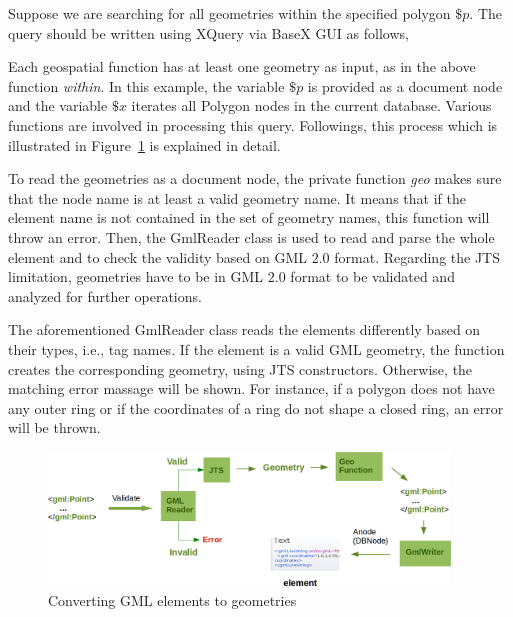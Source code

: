 \documentclass[a4paper,12pt]{article}
\begin{document}
Suppose we are searching for all geometries within the specified polygon $\$p$. The query should be written using XQuery via BaseX GUI as follows,
\vspace{10px}
\vspace{10px}
Each geospatial function has at least one geometry as input, as in the above function \textit{within}. In this example, the variable $\$p$ is provided as a document node and the variable $\$x$ iterates all Polygon nodes in the current database. Various functions are involved in processing this query. Followings, this process which is illustrated in Figure~\ref{figGeoModuleProcess} is explained in detail. 

To read the geometries as a document node, the private function \textit{geo} makes sure that the node name is at least a valid geometry name. It means that if the element name is not contained in the set of geometry names, this function will throw an error. 
Then, the GmlReader class is used to read and parse the whole element and to check the validity based on GML $2.0$ format. Regarding the JTS limitation, geometries have to be in GML $2.0$ format to be validated and analyzed for further operations. 

The aforementioned GmlReader class reads the elements differently based on their types, i.e., tag names. If the element is a valid GML geometry, the function creates the corresponding geometry, using JTS constructors. Otherwise, the matching error massage will be shown. For instance, if a polygon does not have any outer ring or if the coordinates of a ring do not shape a closed ring, an error will be thrown. 

 \begin{figure}
\centering
\includegraphics[width=0.95\textwidth]{GeoModuleProcess}
\caption{Converting GML elements to geometries}
\label{figGeoModuleProcess}
\end{figure}
\end{document}
